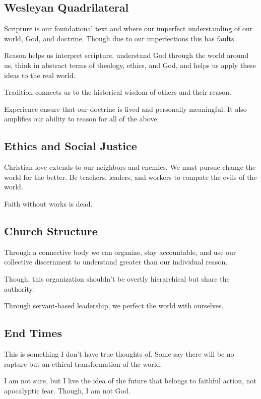 \subsection{Wesleyan Quadrilateral}
\par Scripture is our foundational text and where our imperfect understanding of our world, God, and doctrine. Though due to our imperfections this has faults.
\par Reason helps us interpret scripture, understand God through the world around us, think in abstract terms of theology, ethics, and God, and helps us apply these ideas to the real world.
\par Tradition connects us to the historical wisdom of others and their reason.
\par Experience ensure that our doctrine is lived and personally meaningful. It also amplifies our ability to reason for all of the above.
\subsection{Ethics and Social Justice}
\par Christian love extends to our neighbors and enemies. We must pursue change the world for the better. Be teachers, leaders, and workers to compate the evils of the world.
\par Faith without works is dead.
\subsection{Church Structure}
\par Through a connective body we can organize, stay accountable, and use our collective discernment to understand greater than our individual reason.
\par Though, this organization shouldn't be overtly hierarchical but share the authority.
\par Through servant-based leadership, we perfect the world with ourselves.
\subsection{End Times}
\par This is something I don't have true thoughts of. Some say there will be no rapture but an ethical transformation of the world.
\par I am not sure, but I live the idea of the future that belongs to faithful action, not apocalyptic fear. Though, I am not God.
